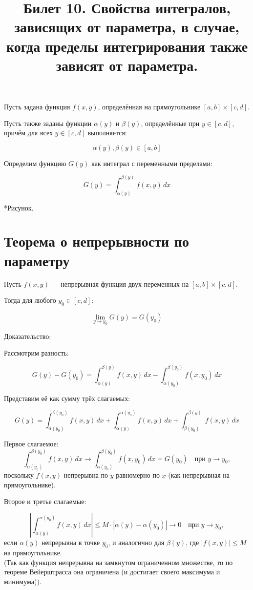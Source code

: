 \documentclass{article}
\title{ Билет 10. Свойства интегралов, зависящих от параметра, в случае, когда пределы интегрирования также зависят от параметра.}
\author{}
\date{}
\begin{document}
\maketitle

Пусть задана функция $ f(x, y) $, определённая на прямоугольнике $ [a, b] \times [c, d] $. 

Пусть также заданы функции $ \alpha(y) $ и $ \beta(y) $, определённые при $ y \in [c, d] $, причём для всех $ y \in [c, d] $ выполняется:

\[
\alpha(y), \beta(y) \in [a, b]
\]

Определим функцию $ G(y) $ как интеграл с переменными пределами:

\[
G(y) = \int_{\alpha(y)}^{\beta(y)} f(x, y) \, dx
\]

*Рисунок.

\section*{Теорема о непрерывности по параметру}

Пусть $ f(x, y) $ — непрерывная функция двух переменных на $ [a, b] \times [c, d] $.

Тогда для любого $ y_0 \in [c, d] $:

\[
\lim_{y \to y_0} G(y) = G(y_0)
\]

Доказательство:

Рассмотрим разность:

\[
G(y) - G(y_0) = \int_{\alpha(y)}^{\beta(y)} f(x, y) \, dx - \int_{\alpha(y_0)}^{\beta(y_0)} f(x, y_0) \, dx
\]

Представим её как сумму трёх слагаемых:

\[
G(y) = \int_{\alpha(y_0)}^{\beta(y_0)} f(x, y) \, dx + \int_{\alpha(y)}^{\alpha(y_0)} f(x, y) \, dx + \int_{\beta(y_0)}^{\beta(y)} f(x, y) \, dx
\]

Первое слагаемое: 
\[
\int_{\alpha(y_0)}^{\beta(y_0)} f(x, y) \, dx \to \int_{\alpha(y_0)}^{\beta(y_0)} f(x, y_0) \, dx = G(y_0)
\quad \text{при } y \to y_0,
\]
поскольку $ f(x, y) $ непрерывна по $ y $ равномерно по $ x $ (как непрерывная на прямоугольнике).

Второе и третье слагаемые:

\[
\left| \int_{\alpha(y)}^{\alpha(y_0)} f(x, y) \, dx \right| \leq M \cdot |\alpha(y) - \alpha(y_0)| \to 0 \quad \text{при } y \to y_0,
\]
если $ \alpha(y) $ непрерывна в точке $ y_0 $, и аналогично для $ \beta(y) $, где $ |f(x,y)| \leq M $ на прямоугольнике.\\
(Так как функция непрерывна на замкнутом ограниченном множестве, то по теореме Вейерштрасса она ограничена (и достигает своего максимума и минимума)).
\end{document}
